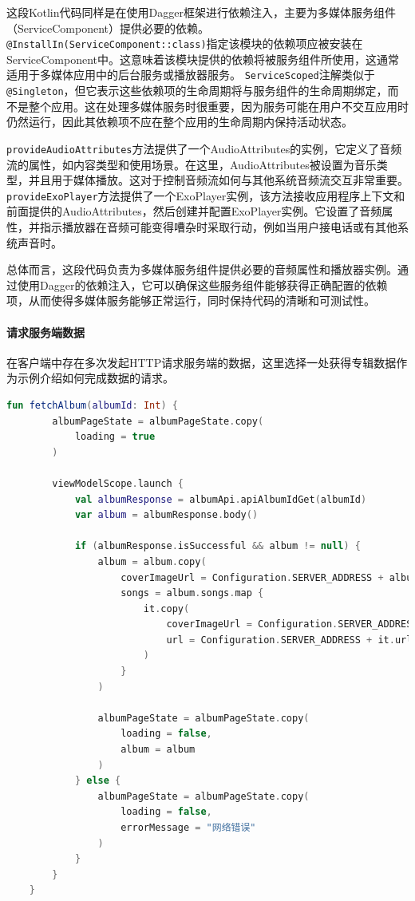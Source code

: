 \documentclass[main.tex]{subfiles}
\begin{document}
这段Kotlin代码同样是在使用Dagger框架进行依赖注入，主要为多媒体服务组件（ServiceComponent）提供必要的依赖。
\texttt{@InstallIn(ServiceComponent::class)}指定该模块的依赖项应被安装在ServiceComponent中。这意味着该模块提供的依赖将被服务组件所使用，这通常适用于多媒体应用中的后台服务或播放器服务。
\texttt{ServiceScoped}注解类似于\texttt{@Singleton}，但它表示这些依赖项的生命周期将与服务组件的生命周期绑定，而不是整个应用。这在处理多媒体服务时很重要，因为服务可能在用户不交互应用时仍然运行，因此其依赖项不应在整个应用的生命周期内保持活动状态。

\texttt{provideAudioAttributes}方法提供了一个AudioAttributes的实例，它定义了音频流的属性，如内容类型和使用场景。在这里，AudioAttributes被设置为音乐类型，并且用于媒体播放。这对于控制音频流如何与其他系统音频流交互非常重要。
\texttt{provideExoPlayer}方法提供了一个ExoPlayer实例，该方法接收应用程序上下文和前面提供的AudioAttributes，然后创建并配置ExoPlayer实例。它设置了音频属性，并指示播放器在音频可能变得嘈杂时采取行动，例如当用户接电话或有其他系统声音时。

总体而言，这段代码负责为多媒体服务组件提供必要的音频属性和播放器实例。通过使用Dagger的依赖注入，它可以确保这些服务组件能够获得正确配置的依赖项，从而使得多媒体服务能够正常运行，同时保持代码的清晰和可测试性。

\paragraph{请求服务端数据}

在客户端中存在多次发起HTTP请求服务端的数据，这里选择一处获得专辑数据作为示例介绍如何完成数据的请求。

\begin{lstlisting}[language=Kotlin]
    fun fetchAlbum(albumId: Int) {
        albumPageState = albumPageState.copy(
            loading = true
        )

        viewModelScope.launch {
            val albumResponse = albumApi.apiAlbumIdGet(albumId)
            var album = albumResponse.body()

            if (albumResponse.isSuccessful && album != null) {
                album = album.copy(
                    coverImageUrl = Configuration.SERVER_ADDRESS + album.coverImageUrl,
                    songs = album.songs.map {
                        it.copy(
                            coverImageUrl = Configuration.SERVER_ADDRESS + it.coverImageUrl,
                            url = Configuration.SERVER_ADDRESS + it.url
                        )
                    }
                )

                albumPageState = albumPageState.copy(
                    loading = false,
                    album = album
                )
            } else {
                albumPageState = albumPageState.copy(
                    loading = false,
                    errorMessage = "网络错误"
                )
            }
        }
    }
\end{lstlisting}
\end{document}
